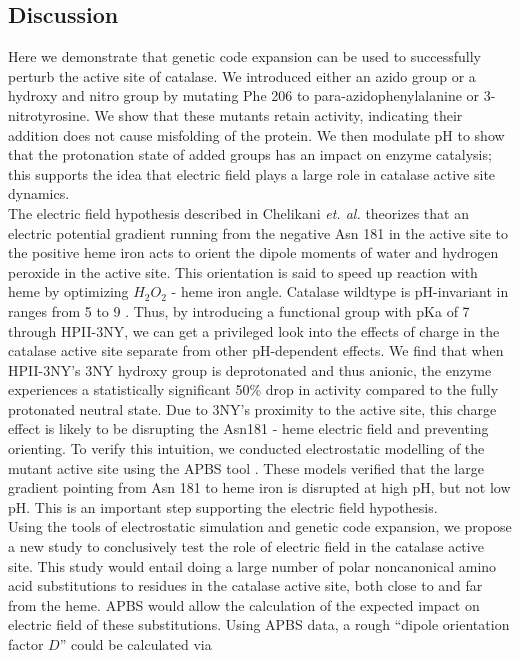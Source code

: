 \documentclass[9pt,twocolumn,twoside]{pnas-new}
\begin{document}
\subsection*{Discussion}
Here we demonstrate that genetic code expansion can be used to successfully perturb the active site of catalase. We introduced either an azido group or a hydroxy and nitro group by mutating Phe 206 to para-azidophenylalanine or 3-nitrotyrosine. We show that these mutants retain activity, indicating their addition does not cause misfolding of the protein. We then modulate pH to show that the protonation state of added groups has an impact on enzyme catalysis; this supports the idea that electric field plays a large role in catalase active site dynamics.\\

The electric field hypothesis described in Chelikani \textit{et. al.} \cite{electricpotential} theorizes that an electric potential gradient running from the negative Asn 181 in the active site to the positive heme iron acts to orient the dipole moments of water and hydrogen peroxide in the active site. This orientation is said to speed up reaction with heme by optimizing $H_2O_2$ - heme iron angle. Catalase wildtype is pH-invariant in ranges from 5 to 9 \cite{phdependence}. Thus, by introducing a functional group with pKa of 7 through HPII-3NY, we can get a privileged look into the effects of charge in the catalase active site separate from other pH-dependent effects. We find that when HPII-3NY's 3NY hydroxy group is deprotonated and thus anionic, the enzyme experiences a statistically significant 50\% drop in activity compared to the fully protonated neutral state. Due to 3NY's proximity to the active site, this charge effect is likely to be disrupting the Asn181 - heme electric field and preventing orienting. To verify this intuition, we conducted electrostatic modelling of the mutant active site using the APBS tool \cite{apbs}. These models verified that the large gradient pointing from Asn 181 to heme iron is disrupted at high pH, but not low pH. This is an important step supporting the electric field hypothesis.\\

Using the tools of electrostatic simulation and genetic code expansion, we propose a new study to conclusively test the role of electric field in the catalase active site. This study would entail doing a large number of polar noncanonical amino acid substitutions to residues in the catalase active site, both close to and far from the heme. APBS would allow the calculation of the expected impact on electric field of these substitutions. Using APBS data, a rough ``dipole orientation factor $D$'' could be calculated via\\
\end{document}
